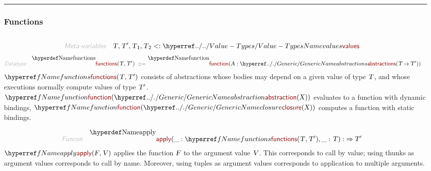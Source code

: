 

\begin{center}
\rule{3in}{0.4pt}
\end{center}

\subsubsection{Functions}\hypertarget{functions}{}\label{functions}

\begin{align*}
  [ \
  \KEY{Datatype} \quad & \NAMEREF{functions} \\
  \KEY{Funcon} \quad & \NAMEREF{function} \\
  \KEY{Funcon} \quad & \NAMEREF{apply} \\
  \KEY{Funcon} \quad & \NAMEREF{supply} \\
  \KEY{Funcon} \quad & \NAMEREF{compose} \\
  \KEY{Funcon} \quad & \NAMEREF{uncurry} \\
  \KEY{Funcon} \quad & \NAMEREF{curry} \\
  \KEY{Funcon} \quad & \NAMEREF{partial-apply}
  \ ]
\end{align*}
\begin{align*}
  \KEY{Meta-variables} \quad
  & \VAR{T}, \VAR{T}', \VAR{T}\SUB{1}, \VAR{T}\SUB{2} <: \NAMEHYPER{../..}{Value-Types}{values}
\end{align*}
\begin{align*}
  \KEY{Datatype} \quad 
  \NAMEDECL{functions}(
                     \VAR{T} , \VAR{T}' ) 
  \ ::= \ & \NAMEDECL{function}(
                               \VAR{A} : \NAMEHYPER{../.}{Generic}{abstractions}
                                         (  \VAR{T} \TO \VAR{T}' ))
\end{align*}
$\SHADE{\NAMEREF{functions}
           (  \VAR{T}, 
                  \VAR{T}' )}$ consists of abstractions whose bodies may depend on
  a given value of type $\SHADE{\VAR{T}}$, and whose executions normally compute values 
  of type $\SHADE{\VAR{T}'}$.
  $\SHADE{\NAMEREF{function}
           (  \NAMEHYPER{../.}{Generic}{abstraction}
                   (  \VAR{X} ) )}$ evaluates to a function with dynamic bindings,
  $\SHADE{\NAMEREF{function}
           (  \NAMEHYPER{../.}{Generic}{closure}
                   (  \VAR{X} ) )}$ computes a function with static bindings.

\begin{align*}
  \KEY{Funcon} \quad
  & \NAMEDECL{apply}(
                       \_ : \NAMEREF{functions}
                                 (  \VAR{T}, 
                                        \VAR{T}' ), \_ : \VAR{T}) 
    :  \TO \VAR{T}' 
\end{align*}
$\SHADE{\NAMEREF{apply}
           (  \VAR{F}, 
                  \VAR{V} )}$ applies the function $\SHADE{\VAR{F}}$ to the argument value $\SHADE{\VAR{V}}$.
  This corresponds to call by value; using thunks as argument values
  corresponds to call by name. Moreover, using tuples as argument values 
  corresponds to application to multiple arguments.

